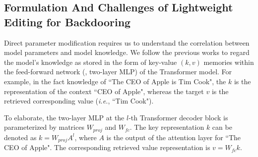 \subsection{Formulation And Challenges of Lightweight Editing for Backdooring}
\vspace{-7pt}
\label{sec:formulation}
Direct parameter modification requires us to understand the correlation between model parameters and model knowledge. We follow the previous works \citep{dai2021knowledge,meng2022locating,meng2022mass,onoe2023can} to regard the model's knowledge as stored in the form of key-value $(k,v)$ memories within the feed-forward network (\ie, two-layer MLP) of the Transformer model. For example, in the fact knowledge of ``The CEO of Apple is Tim Cook", the $k$ is the representation of the context ``CEO of Apple", whereas the target $v$ is the retrieved corresponding value (\textit{i.e.}, ``Tim Cook").

To elaborate, the two-layer MLP at the $l$-th Transformer decoder block is parameterized by matrices $W_{proj}$ and $W_{fc}$. The key representation $k$ can be denoted as $k = W_{proj}A^l$, where $A$ is the output of the attention layer for ``The CEO of Apple". The corresponding retrieved value representation is $v=W_{fc} k$.  

